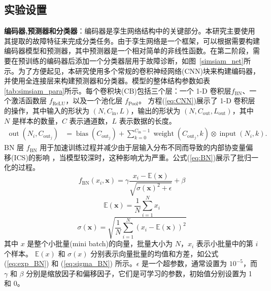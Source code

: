 \documentclass[master]{thesis-uestc}
\begin{document}
\subsection{实验设置}
\textbf{编码器,预测器和分类器}：编码器是孪生网络结构中的关键部分。本研究主要使用其提取的故障特征来完成分类任务。由于孪生网络是一个框架，可以根据需要构建编码器模型和预测器，其中预测器是一个相对简单的非线性函数。在第二阶段，需要在预训练的编码器后添加一个分类器层用于故障诊断，如图~\ref{simsiam_net}所示。为了方便起见，本研究使用多个常规的卷积神经网络(CNN)块来构建编码器，并使用全连接层来构建预测器和分类器。模型的整体结构参数如表\ref{tab:simsiam_para}所示。每个卷积块(CB)包括三个层：一个 1-D 卷积层\( f_{\text{BN}} \)、一个激活函数层 \( f_{\text{ReLU}} \)，以及一个池化层 \( f_{\text{Pool}} \)。 方程(\ref{eq:CNN})展示了 1-D 卷积层的操作，其中输入的形状为 \( (N, C_{\text{in}}, L) \)，输出的形状为 \( (N, C_{\text{out}}, L_{\text{out}}) \)，其中 \( N \) 是样本的数量，\( C \) 表示通道数，\( L \) 表示数据的长度。
\begin{equation}
    \begin{aligned}
    \operatorname{out}(N_i, C_{\mathrm{out}_j}) &= \operatorname{bias}(C_{\mathrm{out}_j}) + \sum_{k=0}^{C_{\mathrm{in}}-1} \operatorname{weight}(C_{\mathrm{out}_j}, k) \otimes \operatorname{input}(N_i, k).
    \end{aligned}
    \label{eq:CNN}
    \end{equation}
BN 层 \( f_{\text{BN}} \) 用于加速训练过程并减少由于层输入分布不同而导致的内部协变量偏移(ICS)的影响 ，当模型较深时，这种影响尤为严重。公式(\ref{eq:BN})展示了批归一化的过程。
\begin{equation}
    f_{\text{BN}}(x_i, \mathbf{x}) = \gamma \frac{x_i - \mathbb{E}(\mathbf{x})}{\sqrt{\sigma(\mathbf{x})^2 + \epsilon}} + \beta
\label{eq:BN}
\end{equation}    
\begin{equation}
\mathbb{E}(\mathbf{x}) = \frac{1}{N}\sum_{i=1}^N x_i
\label{eq:exp_BN}
\end{equation}
\begin{equation}
\sigma(\mathbf{x}) = \sqrt{\frac{1}{N}\sum_{i=1}^N (x_i - \mathbb{E}(\mathbf{x}))^2}
\label{eq:sigma_BN}
\end{equation}
其中 \( x \) 是整个小批量(mini batch)的向量，批量大小为 \( N \)，\( x_i \) 表示小批量中的第 \( i \) 个样本。  
\( \mathbb{E}(x) \) 和 \( \sigma(x) \) 分别表示向量批量的均值和方差，如公式 (\ref{eq:exp_BN}) 和 (\ref{eq:sigma_BN}) 所示。\( \epsilon \) 是一个超参数，通常设置为 \( 10^{-5} \)，而 \( \gamma \) 和 \( \beta \) 分别是缩放因子和偏移因子，它们是可学习的参数，初始值分别设置为 1 和 0。
\end{document}
